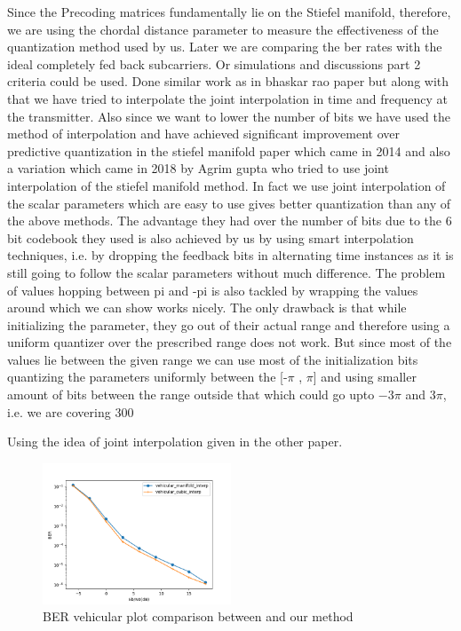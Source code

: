 \documentclass[conference]{IEEEtran}
\begin{document}
\noindent Since the Precoding matrices fundamentally lie on the Stiefel manifold, therefore, we are using the chordal distance parameter to measure the effectiveness of the quantization method used by us. Later we are comparing the ber rates with the ideal completely fed back subcarriers. Or simulations and discussions part 2 criteria could be used. Done similar work as in bhaskar rao paper but along with that we have tried to interpolate the joint interpolation in time and frequency at the transmitter. Also since we want to lower the number of bits we have used the method of interpolation and have achieved significant improvement over predictive quantization in the stiefel manifold paper which came in 2014 and also a variation which came in 2018 by Agrim gupta who tried to use joint interpolation of the stiefel manifold method. In fact we use joint interpolation of the scalar parameters which are easy to use gives better quantization than any of the above methods. 
The advantage they had over the number of bits due to the 6 bit codebook they used is also achieved by us by using smart interpolation techniques, i.e. by dropping the feedback bits in alternating time instances as it is still going to follow the scalar parameters without much difference. 
The problem of values hopping between pi and -pi is also tackled by wrapping the values around which we can show works nicely. The only drawback is that while initializing the parameter, they go out of their actual range and therefore using a uniform quantizer over the prescribed range does not work. But since most of the values lie between the given range we can use most of the initialization bits quantizing the parameters uniformly between the [-$\pi$ , $\pi$] and using smaller amount of bits between the range outside that which could go upto $-3\pi$ and $3\pi$, i.e. we are covering 300%

Using the idea of joint interpolation given in the other paper.  
\begin{figure}
\includegraphics[width=0.5\textwidth]{images/vehicular_ber.png}

\caption{BER vehicular plot comparison between \cite{Gupta1905} and our method} 
\label{ber_overview}
\vspace{-5pt}
\end{figure}
\end{document}
